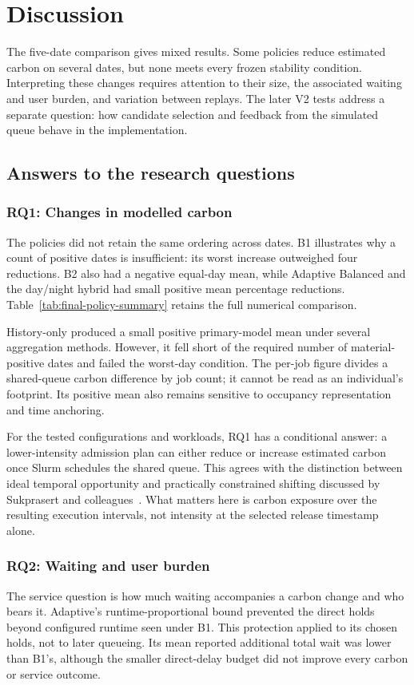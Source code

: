 \chapter{Discussion}\label{ch:discussion}
The five-date comparison gives mixed results. Some policies reduce estimated carbon on several dates, but none meets every frozen stability condition. Interpreting these changes requires attention to their size, the associated waiting and user burden, and variation between replays. The later V2 tests address a separate question: how candidate selection and feedback from the simulated queue behave in the implementation.

\section{Answers to the research questions}
\subsection{RQ1: Changes in modelled carbon}
The policies did not retain the same ordering across dates. B1 illustrates why a count of positive dates is insufficient: its worst increase outweighed four reductions. B2 also had a negative equal-day mean, while Adaptive Balanced and the day/night hybrid had small positive mean percentage reductions. Table~\ref{tab:final-policy-summary} retains the full numerical comparison.

History-only produced a small positive primary-model mean under several aggregation methods. However, it fell short of the required number of material-positive dates and failed the worst-day condition. The per-job figure divides a shared-queue carbon difference by job count; it cannot be read as an individual's footprint. Its positive mean also remains sensitive to occupancy representation and time anchoring.

For the tested configurations and workloads, RQ1 has a conditional answer: a lower-intensity admission plan can either reduce or increase estimated carbon once Slurm schedules the shared queue. This agrees with the distinction between ideal temporal opportunity and practically constrained shifting discussed by Sukprasert and colleagues~\cite{sukprasert2024limitations}. What matters here is carbon exposure over the resulting execution intervals, not intensity at the selected release timestamp alone.

\subsection{RQ2: Waiting and user burden}
The service question is how much waiting accompanies a carbon change and who bears it. Adaptive's runtime-proportional bound prevented the direct holds beyond configured runtime seen under B1. This protection applied to its chosen holds, not to later queueing. Its mean reported additional total wait was lower than B1's, although the smaller direct-delay budget did not improve every carbon or service outcome.

